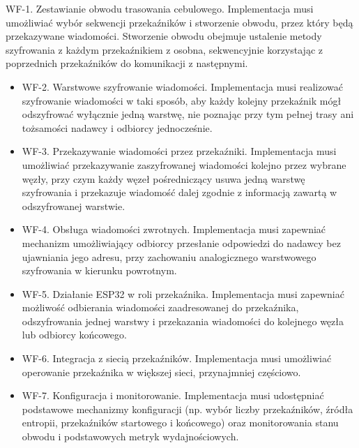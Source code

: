 \documentclass[thesis=inz,faculty=ee]{EE-dyplom}
\begin{document}
    WF-1. Zestawianie obwodu trasowania cebulowego.
    Implementacja musi umożliwiać wybór sekwencji przekaźników i stworzenie obwodu, przez który będą przekazywane wiadomości. Stworzenie obwodu obejmuje 
    ustalenie metody szyfrowania z każdym przekaźnikiem z osobna, sekwencyjnie korzystając z poprzednich przekaźników do komunikacji z następnymi.

    \begin{itemize}

    \item WF-2. Warstwowe szyfrowanie wiadomości.
    Implementacja musi realizować szyfrowanie wiadomości w taki sposób, aby każdy kolejny przekaźnik mógł odszyfrować wyłącznie jedną warstwę, nie poznając przy tym pełnej 
    trasy ani tożsamości nadawcy i odbiorcy jednocześnie.

    \item WF-3. Przekazywanie wiadomości przez przekaźniki.
    Implementacja musi umożliwiać przekazywanie zaszyfrowanej wiadomości kolejno przez wybrane węzły, przy czym każdy węzeł pośredniczący usuwa jedną warstwę szyfrowania i 
    przekazuje wiadomość dalej zgodnie z informacją zawartą w odszyfrowanej warstwie.

    \item WF-4. Obsługa wiadomości zwrotnych.
    Implementacja musi zapewniać mechanizm umożliwiający odbiorcy przesłanie odpowiedzi do nadawcy bez ujawniania jego adresu, przy zachowaniu analogicznego warstwowego 
    szyfrowania w kierunku powrotnym.

    \item WF-5. Działanie ESP32 w roli przekaźnika.
    Implementacja musi zapewniać możliwość odbierania wiadomości zaadresowanej do przekaźnika, odszyfrowania jednej warstwy i przekazania 
    wiadomości do kolejnego węzła lub odbiorcy końcowego.

    \item WF-6. Integracja z siecią przekaźników.
    Implementacja musi umożliwiać operowanie przekaźnika w większej sieci, przynajmniej częściowo.

    \item WF-7. Konfiguracja i monitorowanie.
    Implementacja musi udostępniać podstawowe mechanizmy konfiguracji (np. wybór liczby przekaźników, źródła entropii, przekaźników startowego i końcowego) 
    oraz monitorowania stanu obwodu i podstawowych metryk wydajnościowych.

    \end{itemize}
\end{document}
